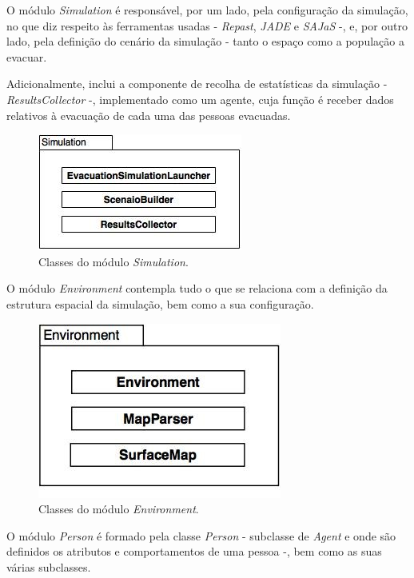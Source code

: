 \documentclass[12pt]{article}
\begin{document}
\begin{titlepage}
O módulo \textit{Simulation} é responsável, por um lado, pela configuração da simulação, no que diz respeito às ferramentas usadas - \textit{Repast}, \textit{JADE} e \textit{SAJaS} -, e, por outro lado, pela definição do cenário da simulação - tanto o espaço como a população a evacuar. 

Adicionalmente, inclui a componente de recolha de estatísticas da simulação - \textit{ResultsCollector} -, implementado como um agente, cuja função é receber dados relativos à evacuação de cada uma das pessoas evacuadas.

\begin{figure}[H]
	\centering
	\includegraphics[scale=0.8]{simulation.jpg}
	\caption{Classes do módulo \textit{Simulation}.}
	\label{uml}
\end{figure}
\newpage
O módulo \textit{Environment} contempla tudo o que se relaciona com a definição da estrutura espacial da simulação, bem como a sua configuração.\newline

\begin{figure}[H]
	\centering
	\includegraphics[scale=0.6]{environment.jpg}
	\caption{Classes do módulo \textit{Environment}.}
	\label{uml}
\end{figure}

O módulo \textit{Person} é formado pela classe \textit{Person} - subclasse de \textit{Agent} e onde são definidos os atributos e comportamentos de uma pessoa -, bem como as suas várias subclasses.


\end{titlepage}
\end{document}
